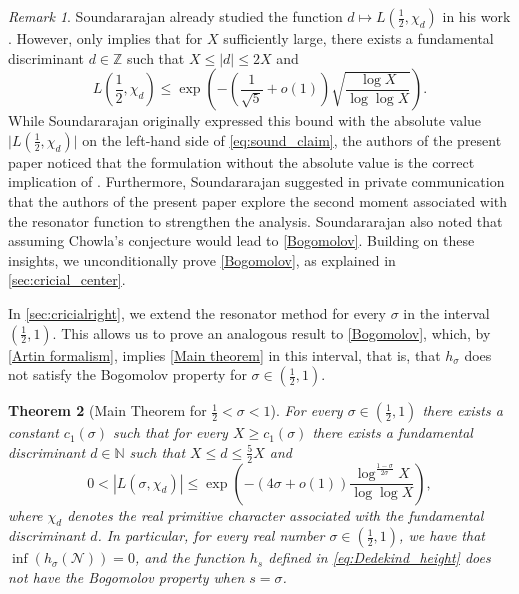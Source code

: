 \documentclass[10pt,a4paper]{amsart}
\theoremstyle{plain}
\newtheorem{theorem}{Theorem}[section]
\theoremstyle{definition}
\theoremstyle{remark}
\newtheorem{remark}[theorem]{Remark}
\begin{document}
\begin{remark}
Soundararajan already studied the function $d \mapsto L\left( \frac{1}{2}, \chi_d \right)$ in his work \cite{Soundararajan_2008}. However,
\cite[Theorem 2]{Soundararajan_2008} only implies that for $X$ sufficiently large, there exists a fundamental discriminant $d \in \mathbb{Z}$ such that $X\leq |d|\leq 2X$ and
\begin{equation} \label{eq:sound_claim}
    L\left(\frac{1}{2},\chi_d\right)\leq \exp\left(-
\left(
\frac{1}{\sqrt{5}}+o(1)\right)\sqrt{\frac{\log X}{\log\log X}}\right).
\end{equation}
While Soundararajan originally expressed this bound with the absolute value $\lvert L\left(\frac{1}{2},\chi_d\right) \rvert$  on the left-hand side of \eqref{eq:sound_claim}, the authors of the present paper noticed that the formulation without the absolute value is the correct implication of \cite[Theorem 2]{Soundararajan_2008}. Furthermore, Soundararajan suggested in private communication that the authors of the present paper explore the second moment associated with the resonator function to strengthen the analysis. Soundararajan also noted that assuming Chowla's conjecture would lead to \cref{Bogomolov}. Building on these insights, we unconditionally prove \cref{Bogomolov}, as explained in \cref{sec:cricial_center}.
\end{remark}

In \cref{sec:cricialright}, we extend the resonator method for every $\sigma$ in the interval $\left(\frac{1}{2},1\right)$. This allows us to prove an analogous result to \cref{Bogomolov}, which, by \eqref{Artin formalism}, implies \cref{Main theorem} in this interval, that is, that $h_\sigma$ does not satisfy the Bogomolov property for $\sigma \in \left(\frac{1}{2},1\right)$.

\begin{theorem}[Main Theorem for $\frac{1}{2} < \sigma < 1$]\label{Bogomolov2}
For every $\sigma \in \left(\frac{1}{2},1\right)$ there exists a constant $c_1(\sigma)$ such that for every $X \geq c_1(\sigma)$ there exists a fundamental discriminant $d \in \mathbb{N}$ such that $X \leq d \leq \frac{5}{2} X$ and 
\[
0<|L(\sigma,\chi_d)|\leq \exp\left(-
\left(
4\sigma+o(1)\right)\frac{\log^{\frac{1-\sigma}{2\sigma}} X}{\log\log X}\right),
\]
where $\chi_d$ denotes the real primitive character associated with the fundamental discriminant $d$. 
In particular, for every real number $\sigma \in \left( \frac{1}{2}, 1 \right)$, we have that $\inf(h_{\sigma}(\mathcal{N})) = 0$, and the function $h_s$ defined in \eqref{eq:Dedekind_height} does not have the Bogomolov property when $s = \sigma$.
\end{theorem}
\end{document}
